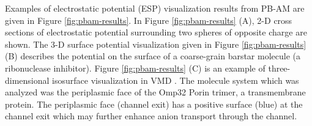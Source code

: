 \documentclass[11pt,titlepage]{article}
\begin{document}
Examples of electrostatic potential (ESP) visualization results from PB-AM are given in Figure \ref{fig:pbam-results}. In Figure \ref{fig:pbam-results} (A), 2-D cross sections of electrostatic potential surrounding two spheres of opposite charge are shown. The 3-D surface potential visualization given in Figure \ref{fig:pbam-results} (B) describes the potential on the surface of a coarse-grain barstar molecule (a ribonuclease inhibitor). Figure \ref{fig:pbam-results} (C) is an example of three-dimensional isosurface visualization in VMD \cite{humphrey1996}. The molecule system which was analyzed was the periplasmic face of the Omp32 Porin trimer, a transmembrane protein. The periplasmic face (channel exit) has a positive surface (blue) at the channel exit which may further enhance anion transport through the channel.  
\end{document}
